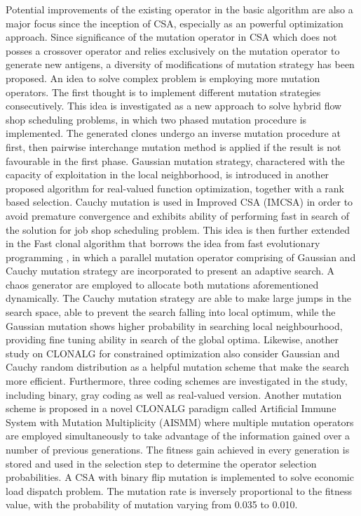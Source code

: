 \documentclass[12pt]{article}
\begin{document}
Potential improvements of the existing operator in the basic algorithm are also a major focus since the inception of CSA, especially as an powerful optimization approach. Since significance of the mutation operator in CSA which does not posses a crossover operator and relies exclusively on the mutation operator to generate new antigens, a diversity of modifications of mutation strategy has been proposed. An idea to solve complex problem is employing more mutation operators. The first thought is to implement different mutation strategies consecutively. This idea is investigated as a new approach to solve hybrid flow shop scheduling problems, in which two phased mutation procedure is implemented. \cite{Engin04Anewapproach} The generated clones undergo an inverse mutation procedure at first, then pairwise interchange mutation method is applied if the result is not favourable in the first phase. Gaussian mutation strategy, charactered with the capacity of exploitation in the local neighborhood, is introduced in another proposed algorithm for real-valued function optimization, together with a rank based selection. \cite{Campelo05Aclonalselection}Cauchy mutation is used in Improved CSA (IMCSA) in order to avoid premature convergence and exhibits ability of performing fast in search of the solution for job shop scheduling problem. \cite{Lu09AnImprovedClonal} This idea is then further extended in the Fast clonal algorithm \cite{Khilwani08Fastclonal} that borrows the idea from fast evolutionary programming \cite{Yao99fep}, in which a parallel mutation operator comprising of Gaussian and Cauchy mutation strategy are incorporated to present an adaptive search. A chaos generator are employed to allocate both mutations aforementioned dynamically. The Cauchy mutation strategy are able to make large jumps in the search space, able to prevent the search falling into local optimum, while the Gaussian mutation shows higher probability in searching local neighbourhood, providing fine tuning ability in search of the global optima. Likewise, another study on CLONALG for constrained optimization also consider Gaussian and Cauchy random distribution as a helpful mutation scheme that make the search more efficient. \cite{Cruz-Cortes05HandlingConstraints} Furthermore, three coding schemes are investigated in the study, including binary, gray coding as well as real-valued version. Another mutation scheme is proposed in a novel CLONALG paradigm called Artificial Immune System with Mutation Multiplicity (AISMM) where multiple mutation operators are employed simultaneously to take advantage of the information gained over a number of previous generations. The fitness gain achieved in every generation is stored and used in the selection step to determine the operator selection probabilities. \cite{Acan04ClonalSelection} A CSA with binary flip mutation is implemented to solve economic load dispatch problem. The mutation rate is inversely proportional to the fitness value, with the probability of mutation varying from 0.035 to 0.010. \cite{Panigrahi2007Aclonalalgorithm}
\end{document}
